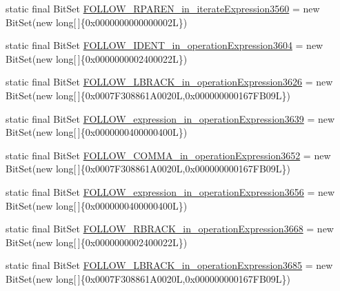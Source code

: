 \begin{DoxyCompactItemize}
\item 
static final Bit\-Set \hyperlink{classorg_1_1tzi_1_1use_1_1parser_1_1soil_1_1_soil_parser_aa81b04cd537bfd36d68f4c7ab3dee305}{F\-O\-L\-L\-O\-W\-\_\-\-R\-P\-A\-R\-E\-N\-\_\-in\-\_\-iterate\-Expression3560} = new Bit\-Set(new long\mbox{[}$\,$\mbox{]}\{0x0000000000000002\-L\})
\item 
static final Bit\-Set \hyperlink{classorg_1_1tzi_1_1use_1_1parser_1_1soil_1_1_soil_parser_aca4b7d5d4a615dabc287c892be984c95}{F\-O\-L\-L\-O\-W\-\_\-\-I\-D\-E\-N\-T\-\_\-in\-\_\-operation\-Expression3604} = new Bit\-Set(new long\mbox{[}$\,$\mbox{]}\{0x0000000002400022\-L\})
\item 
static final Bit\-Set \hyperlink{classorg_1_1tzi_1_1use_1_1parser_1_1soil_1_1_soil_parser_a6b5e14c9ced023f38590dacb9db5b3a5}{F\-O\-L\-L\-O\-W\-\_\-\-L\-B\-R\-A\-C\-K\-\_\-in\-\_\-operation\-Expression3626} = new Bit\-Set(new long\mbox{[}$\,$\mbox{]}\{0x0007\-F308861\-A0020\-L,0x000000000167\-F\-B09\-L\})
\item 
static final Bit\-Set \hyperlink{classorg_1_1tzi_1_1use_1_1parser_1_1soil_1_1_soil_parser_ab9ae9f0143254cf65777b031c3d05b49}{F\-O\-L\-L\-O\-W\-\_\-expression\-\_\-in\-\_\-operation\-Expression3639} = new Bit\-Set(new long\mbox{[}$\,$\mbox{]}\{0x0000000400000400\-L\})
\item 
static final Bit\-Set \hyperlink{classorg_1_1tzi_1_1use_1_1parser_1_1soil_1_1_soil_parser_a30cc9a6031ae7656589153d2b4a31da7}{F\-O\-L\-L\-O\-W\-\_\-\-C\-O\-M\-M\-A\-\_\-in\-\_\-operation\-Expression3652} = new Bit\-Set(new long\mbox{[}$\,$\mbox{]}\{0x0007\-F308861\-A0020\-L,0x000000000167\-F\-B09\-L\})
\item 
static final Bit\-Set \hyperlink{classorg_1_1tzi_1_1use_1_1parser_1_1soil_1_1_soil_parser_a0d41eb3dea0133dfc4bae3e8843ca4a2}{F\-O\-L\-L\-O\-W\-\_\-expression\-\_\-in\-\_\-operation\-Expression3656} = new Bit\-Set(new long\mbox{[}$\,$\mbox{]}\{0x0000000400000400\-L\})
\item 
static final Bit\-Set \hyperlink{classorg_1_1tzi_1_1use_1_1parser_1_1soil_1_1_soil_parser_a31a1443733b2e4b24f15ba8f2ab0e89c}{F\-O\-L\-L\-O\-W\-\_\-\-R\-B\-R\-A\-C\-K\-\_\-in\-\_\-operation\-Expression3668} = new Bit\-Set(new long\mbox{[}$\,$\mbox{]}\{0x0000000002400022\-L\})
\item 
static final Bit\-Set \hyperlink{classorg_1_1tzi_1_1use_1_1parser_1_1soil_1_1_soil_parser_a4586de7d0443c34d86179e8018793419}{F\-O\-L\-L\-O\-W\-\_\-\-L\-B\-R\-A\-C\-K\-\_\-in\-\_\-operation\-Expression3685} = new Bit\-Set(new long\mbox{[}$\,$\mbox{]}\{0x0007\-F308861\-A0020\-L,0x000000000167\-F\-B09\-L\})

\end{DoxyCompactItemize}

